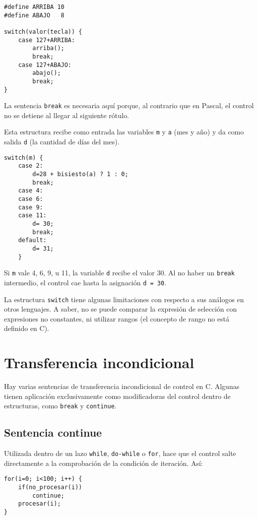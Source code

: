 \begin{lstlisting}
#define ARRIBA 10
#define ABAJO   8

switch(valor(tecla)) {
    case 127+ARRIBA:
        arriba();
        break;
    case 127+ABAJO:
        abajo();
        break;
}
\end{lstlisting}
La sentencia \lstinline{break}
 es necesaria aquí porque, al contrario que en Pascal, el
control no se detiene al llegar al siguiente rótulo.

\begin{ejemplo}
Esta estructura recibe como entrada las variables \lstinline{m} y \lstinline{a} (mes y año) y da como
salida \lstinline{d} (la cantidad de días del mes).

\begin{lstlisting}
switch(m) {
    case 2:
        d=28 + bisiesto(a) ? 1 : 0;
        break;
    case 4:
    case 6:
    case 9:
    case 11:
        d= 30;
        break; 
	default:
        d= 31;
    }
\end{lstlisting}
Si \lstinline{m} vale 4, 6, 9, u 11, la variable \lstinline{d} recibe el valor 30. Al no haber un \lstinline{break}
intermedio, el control cae hasta la asignación \lstinline{d = 30}.

La estructura \lstinline{switch} tiene algunas limitaciones con respecto a sus análogos en otros lenguajes. A saber, no se puede comparar la expresión de selección con
expresiones no constantes, ni utilizar rangos (el concepto de rango no está
definido en C).
\end{ejemplo}

\section{Transferencia incondicional}
Hay varias sentencias de transferencia incondicional de control en C. Algunas
tienen aplicación exclusivamente como modificadoras del control dentro de
estructuras, como \lstinline{break} y \lstinline{continue}.

\subsection{Sentencia continue}
Utilizada dentro de un lazo \lstinline{while}, \lstinline{do-while} o \lstinline{for}, hace que el control salte
directamente a la comprobación de la condición de iteración. Así:

\begin{lstlisting}
for(i=0; i<100; i++) {
    if(no_procesar(i))
        continue;
    procesar(i);
}
\end{lstlisting}

